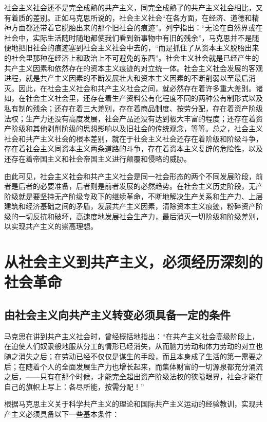 \documentclass{book}
\begin{document}
社会主义社会还不是完全成熟的共产主义，同完全成熟了的共产主义社会相比，又有着质的差别。正如马克思所说的，社会主义社会“在各方面，在经济、道德和精神方面都还带着它脱胎出来的那个旧社会的痕迹”。列宁指出：“无论在自然界或在社会中，实际生活随时随地都使我们看到新事物中有旧的残余”，马克思并不是随便地把旧社会的痕迹塞到社会主义社会中去的，“而是抓住了从资本主义脱胎出来的社会里那种在经济上和政治上不可避免的东西”。社会主义社会就是已经产生的共产主义因素和依然存在的资本主义痕迹的对立统一体。社会主义社会发展的客观进程，就是共产主义因素的不断发展壮大和资本主义因素的不断削弱以至最后消灭。因此，在社会主义社会和共产主义社会之间，就必然存在着许多重大差别。诸如，在社会主义社会里，还存在着生产资料公有化程度不同的两种公有制形式以及私有制的残余；还存在着三大差别，存在着商品制度、按劳分配，存在着资产阶级法权；生产力还没有高度发展，社会产品还没有达到极大丰富的程度；还存在着资产阶级和其他剥削阶级的思想影响以及旧社会的传统观念，等等。总之，社会主义社会和共产主义社会的根本差别，就在于社会主义社会还存在着阶级和阶级斗争，存在着社会主义同资本主义两条道路的斗争，存在着资本主义复辟的危险性，以及还存在着帝国主义和社会帝国主义进行颠覆和侵略的威胁。

由此可见，社会主义社会和共产主义社会是同一社会形态的两个不同发展阶段，前者是后者的必要准备，后者则是前者发展的必然趋势。在社会主义历史阶段，无产阶级就是要坚持无产阶级专政下的继续革命，不断地解决生产关系和生产力、上层建筑和经济基础之间的矛盾，发展共产主义因素，清除资本主义痕迹，粉碎资产阶级的一切反抗和破坏，高速度地发展社会生产力，最后消灭一切阶级和阶级差别，以实现共产主义的崇高理想。

\section{从社会主义到共产主义，必须经历深刻的社会革命}

\subsection{由社会主义向共产主义转变必须具备一定的条件}

马克思在讲到共产主义社会时，曾经概括地指出：“在共产主义社会高级阶段上，在迫使人们奴隶般地服从分工的情形已经消失，从而脑力劳动和体力劳动的对立也随之消失之后；在劳动已经不仅仅是谋生的手段，而且本身成了生活的第一需要之后；在随着个人的全面发展生产力也增长起来，而集体财富的一切源泉都充分涌流之后，——只有在那个时候，才能完全超出资产阶级法权的狭隘眼界，社会才能在自己的旗帜上写上：各尽所能，按需分配！”

根据马克思主义关于科学共产主义的理论和国际共产主义运动的经验教训，实现共产主义必须具备以下一些基本条件：
\end{document}
